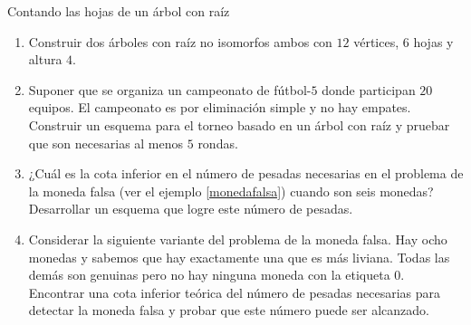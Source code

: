 \begin{section}{Contando las hojas de un árbol con raíz}
\begin{enumerate}
\item Construir dos árboles con raíz no isomorfos ambos con $12$ vértices, $6$ hojas y altura $4$.    
    
\item Suponer que se organiza un campeonato de fútbol-$5$ donde participan $20$ equipos. El cam\-peo\-na\-to es por eliminación simple y no hay empates. Cons\-truir un esquema para el torneo basado en un árbol con raíz y pruebar que son necesarias al menos $5$ rondas. 

\item ¿Cuál es la cota inferior en el número de pesadas necesarias en el problema de la moneda falsa (ver el ejemplo \ref{monedafalsa}) cuando son seis monedas? Desarrollar un esquema que logre este número de pesadas.

\item Considerar la siguiente variante del problema de la moneda falsa. Hay ocho monedas y sabemos que hay exactamente una que es más liviana. Todas las demás son genuinas pero no hay ninguna moneda con la etiqueta $0$. Encontrar una cota inferior teórica del número de pesadas necesarias para detectar la moneda falsa y probar que este número puede ser alcanzado.
\end{enumerate}

\end{section}


